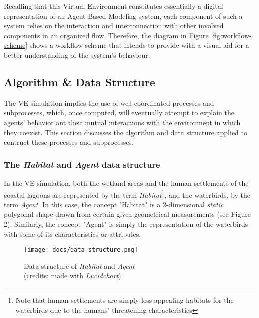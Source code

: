 Recalling that this Virtual Environment constitutes essentially a digital representation of an Agent-Based Modeling system, each component of such a system relies on the interaction and interconnection with other involved components in an organized flow. Therefore, the diagram in Figure \ref{fig:workflow-scheme} shows a workflow scheme that intends to provide with a visual aid for a better understanding of the system's behaviour.

\subsection{Algorithm \& Data Structure}
The VE simulation implies the use of well-coordinated processes and subprocesses, which, once computed, will eventually attempt to explain the agents' behavior ant their mutual interactions with the environment in which they coexist. This section discusses the algorithm and data structure applied to contruct these processes and subprocesses.

\subsubsection{The \emph{Habitat} and \emph{Agent} data structure}
In the VE simulation, both the wetland areas and the human settlements of the coastal lagoons are represented by the term \emph{Habitat}\footnote{Note that human settlements are simply less appealing habitats for the waterbirds due to the humans' threatening characteristics}, and the waterbirds, by the term \emph{Agent}. In this case, the concept "Habitat"  is a 2-dimensional \emph{static} polygonal shape drawn from certain given geometrical measurements (see Figure 2). Similarly, the concept "Agent" is simply the representation of the waterbirds with some of its characteristics or attributes.

\begin{figure}[h!]
    \centering
    \texttt{[image: docs/data-structure.png]}
    \caption{Data structure of \emph{Habitat} and \emph{Agent} \\ (credits: made with \emph{Lucidchart})}
    \label{fig:data-structure}
\end{figure}

